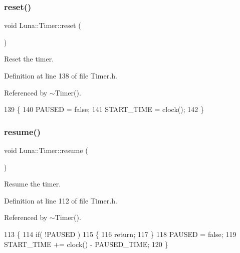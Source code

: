 \subsubsection{\texorpdfstring{reset()}{reset()}}
{\footnotesize\ttfamily void Luna\+::\+Timer\+::reset (\begin{DoxyParamCaption}{ }\end{DoxyParamCaption})\hspace{0.3cm}{\ttfamily [inline]}}



Reset the timer. 



Definition at line 138 of file Timer.\+h.



Referenced by $\sim$\+Timer().


\begin{DoxyCode}
139     \{
140         PAUSED = \textcolor{keyword}{false};
141         START\_TIME = clock();
142     \}
\end{DoxyCode}
\mbox{\label{classLuna_1_1Timer_abf0e92e9d430cdf42c0ebe21e8220c91}} 
\subsubsection{\texorpdfstring{resume()}{resume()}}
{\footnotesize\ttfamily void Luna\+::\+Timer\+::resume (\begin{DoxyParamCaption}{ }\end{DoxyParamCaption})\hspace{0.3cm}{\ttfamily [inline]}}



Resume the timer. 



Definition at line 112 of file Timer.\+h.



Referenced by $\sim$\+Timer().


\begin{DoxyCode}
113     \{
114         \textcolor{keywordflow}{if}( !PAUSED )
115         \{
116             \textcolor{keywordflow}{return};
117         \}
118         PAUSED = \textcolor{keyword}{false};
119         START\_TIME += clock() - PAUSED\_TIME;
120     \}
\end{DoxyCode}
\mbox{\label{classLuna_1_1Timer_ab074740a502b02be0bb64ef3320733b3}} 
